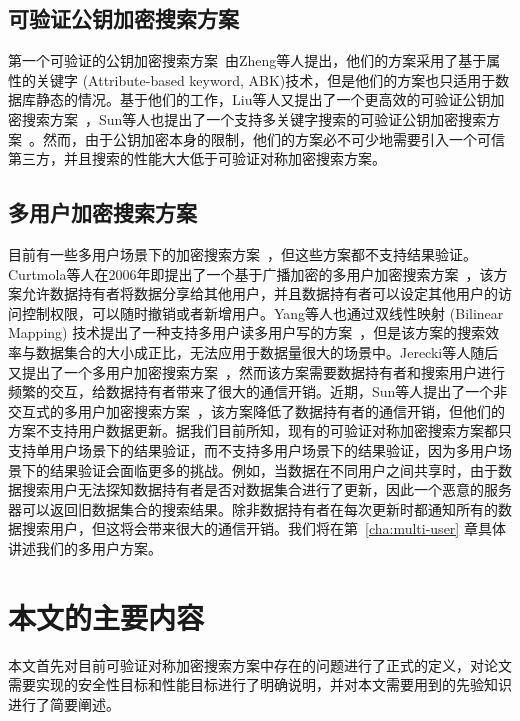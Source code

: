 \subsection{可验证公钥加密搜索方案}
第一个可验证的公钥加密搜索方案~\cite{zheng2014vabks}由Zheng等人提出，他们的方案采用了基于属性的关键字 (Attribute-based keyword, ABK)技术，但是他们的方案也只适用于数据库静态的情况。基于他们的工作，Liu等人又提出了一个更高效的可验证公钥加密搜索方案~\cite{liu2014efficient}，Sun等人也提出了一个支持多关键字搜索的可验证公钥加密搜索方案~\cite{sun2015catch}。然而，由于公钥加密本身的限制，他们的方案必不可少地需要引入一个可信第三方，并且搜索的性能大大低于可验证对称加密搜索方案。

\subsection{多用户加密搜索方案}
目前有一些多用户场景下的加密搜索方案~\cite{curtmola2011searchable,yang2009multiuser,jarecki2013outsourced,sun2016efficient}，但这些方案都不支持结果验证。Curtmola等人在2006年即提出了一个基于广播加密的多用户加密搜索方案~\cite{curtmola2011searchable}，该方案允许数据持有者将数据分享给其他用户，并且数据持有者可以设定其他用户的访问控制权限，可以随时撤销或者新增用户。Yang等人也通过双线性映射 (Bilinear Mapping) 技术提出了一种支持多用户读多用户写的方案~\cite{yang2009multiuser}，但是该方案的搜索效率与数据集合的大小成正比，无法应用于数据量很大的场景中。Jerecki等人随后又提出了一个多用户加密搜索方案~\cite{jarecki2013outsourced}，然而该方案需要数据持有者和搜索用户进行频繁的交互，给数据持有者带来了很大的通信开销。近期，Sun等人提出了一个非交互式的多用户加密搜索方案~\cite{sun2016efficient}，该方案降低了数据持有者的通信开销，但他们的方案不支持用户数据更新。据我们目前所知，现有的可验证对称加密搜索方案都只支持单用户场景下的结果验证，而不支持多用户场景下的结果验证，因为多用户场景下的结果验证会面临更多的挑战。例如，当数据在不同用户之间共享时，由于数据搜索用户无法探知数据持有者是否对数据集合进行了更新，因此一个恶意的服务器可以返回旧数据集合的搜索结果。除非数据持有者在每次更新时都通知所有的数据搜索用户，但这将会带来很大的通信开销。我们将在第~\ref{cha:multi-user} 章具体讲述我们的多用户方案。


\section{本文的主要内容}
本文首先对目前可验证对称加密搜索方案中存在的问题进行了正式的定义，对论文需要实现的安全性目标和性能目标进行了明确说明，并对本文需要用到的先验知识进行了简要阐述。

